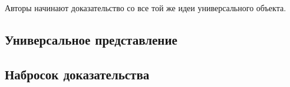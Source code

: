 Авторы начинают доказательство со все той же идеи универсального объекта.

\subsection{Универсальное представление}\label{subsec:ben-ezra-zelmanov-universal}

\subsection{Набросок доказательства}\label{subsec:ben-ezra-zelmanov-non-injective}